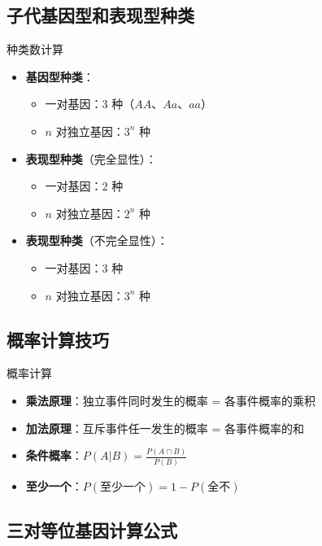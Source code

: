 \documentclass[a4paper,11pt]{ctexart}
\begin{document}
\subsection{子代基因型和表现型种类}

\begin{lemmabox}{种类数计算}
\begin{itemize}[leftmargin=2em]
    \item \textbf{基因型种类}：
        \begin{itemize}
            \item 一对基因：$3$ 种（$AA$、$Aa$、$aa$）
            \item $n$ 对独立基因：$3^n$ 种
        \end{itemize}
    \item \textbf{表现型种类}（完全显性）：
        \begin{itemize}
            \item 一对基因：$2$ 种
            \item $n$ 对独立基因：$2^n$ 种
        \end{itemize}
    \item \textbf{表现型种类}（不完全显性）：
        \begin{itemize}
            \item 一对基因：$3$ 种
            \item $n$ 对独立基因：$3^n$ 种
        \end{itemize}
\end{itemize}
\end{lemmabox}

\subsection{概率计算技巧}

\begin{lemmabox}{概率计算}
\begin{itemize}[leftmargin=2em]
    \item \textbf{乘法原理}：独立事件同时发生的概率 = 各事件概率的乘积
    \item \textbf{加法原理}：互斥事件任一发生的概率 = 各事件概率的和
    \item \textbf{条件概率}：$P(A|B) = \frac{P(A \cap B)}{P(B)}$
    \item \textbf{至少一个}：$P(\text{至少一个}) = 1 - P(\text{全不})$
\end{itemize}
\end{lemmabox}

\subsection{三对等位基因计算公式}
\end{document}

